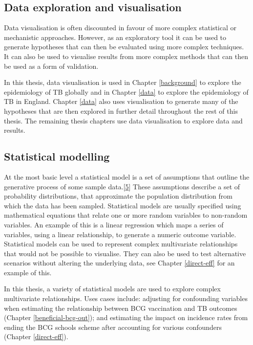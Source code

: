 \documentclass[11pt,twoside]{bristolthesis}
\begin{document}
  \hypertarget{data-exploration-and-visualisation}{%
  \subsection{Data exploration and visualisation}\label{data-exploration-and-visualisation}}
  
  Data visualisation is often discounted in favour of more complex statistical or mechanistic approaches. However, as an exploratory tool it can be used to generate hypotheses that can then be evaluated using more complex techniques. It can also be used to visualise results from more complex methods that can then be used as a form of validation.
  
  In this thesis, data visualisation is used in Chapter \ref{background} to explore the epidemiology of TB globally and in Chapter \ref{data} to explore the epidemiology of TB in England. Chapter \ref{data} also uses visualisation to generate many of the hypotheses that are then explored in further detail throughout the rest of this thesis. The remaining thesis chapters use data visualisation to explore data and results.
  
  \hypertarget{statistical-modelling}{%
  \subsection{Statistical modelling}\label{statistical-modelling}}
  
  At the most basic level a statistical model is a set of assumptions that outline the generative process of some sample data.{[}\protect\hyperlink{ref-McElreath:2018j}{5}{]} These assumptions describe a set of probability distributions, that approximate the population distribution from which the data has been sampled. Statistical models are usually specified using mathematical equations that relate one or more random variables to non-random variables. An example of this is a linear regression which maps a series of variables, using a linear relationship, to generate a numeric outcome variable. Statistical models can be used to represent complex multivariate relationships that would not be possible to visualise. They can also be used to test alternative scenarios without altering the underlying data, see Chapter \ref{direct-eff} for an example of this.
  
  In this thesis, a variety of statistical models are used to explore complex multivariate relationships. Uses cases include: adjusting for confounding variables when estimating the relationship between BCG vaccination and TB outcomes (Chapter \ref{beneficial-bcg-out}); and estimating the impact on incidence rates from ending the BCG schools scheme after accounting for various confounders (Chapter \ref{direct-eff}).
  
\end{document}
